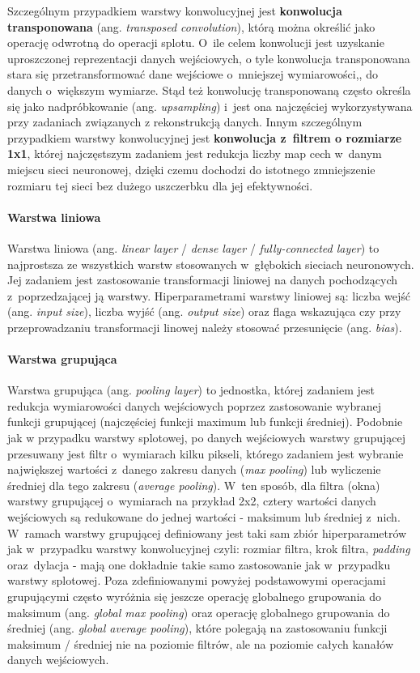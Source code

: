 Szczególnym przypadkiem warstwy konwolucyjnej jest \textbf{konwolucja transponowana} (ang. \emph{transposed convolution}), którą można określić jako operację odwrotną do operacji splotu. O~ile celem konwolucji jest uzyskanie uproszczonej reprezentacji danych wejściowych, o tyle konwolucja transponowana stara się przetransformować dane wejściowe o~mniejszej wymiarowości,, do danych o~większym wymiarze. Stąd też konwolucję transponowaną często określa się jako nadpróbkowanie (ang. \emph{upsampling}) i~jest ona najczęściej wykorzystywana przy zadaniach związanych z rekonstrukcją danych. Innym szczególnym przypadkiem warstwy konwolucyjnej jest \textbf{konwolucja z~filtrem o rozmiarze 1x1}, której najczęstszym zadaniem jest redukcja liczby map cech w~danym miejscu sieci neuronowej, dzięki czemu dochodzi do istotnego zmniejszenie rozmiaru tej sieci bez dużego uszczerbku dla jej efektywności. 

\paragraph*{Warstwa liniowa}

Warstwa liniowa (ang. \emph{linear layer} / \emph{dense layer} / \emph{fully-connected layer}) to najprostsza ze wszystkich warstw stosowanych w~głębokich sieciach neuronowych. Jej zadaniem jest zastosowanie transformacji liniowej na danych pochodzących z~poprzedzającej ją warstwy. Hiperparametrami warstwy liniowej są: liczba wejść (ang. \emph{input size}), liczba wyjść (ang. \emph{output size}) oraz flaga wskazująca czy przy przeprowadzaniu transformacji linowej należy stosować przesunięcie (ang. \emph{bias}).

\paragraph*{Warstwa grupująca}

Warstwa grupująca (ang. \emph{pooling layer}) to jednostka, której zadaniem jest redukcja wymiarowości danych wejściowych poprzez zastosowanie wybranej funkcji grupującej (najczęściej funkcji maximum lub funkcji średniej). Podobnie jak w przypadku warstwy splotowej, po danych wejściowych warstwy grupującej przesuwany jest filtr o~wymiarach kilku pikseli, którego zadaniem jest wybranie największej wartości z~danego zakresu danych (\emph{max pooling}) lub wyliczenie średniej dla tego zakresu (\emph{average pooling}). W~ten sposób, dla filtra (okna) warstwy grupującej o~wymiarach na przykład 2x2, cztery wartości danych wejściowych są redukowane do jednej wartości - maksimum lub średniej z~nich. W~ramach warstwy grupującej definiowany jest taki sam zbiór hiperparametrów jak w~przypadku warstwy konwolucyjnej czyli: rozmiar filtra, krok filtra, \emph{padding} oraz~dylacja - mają one dokładnie takie samo zastosowanie jak w~przypadku warstwy splotowej. Poza zdefiniowanymi powyżej podstawowymi operacjami grupującymi często wyróżnia się jeszcze operację globalnego grupowania do maksimum (ang. \emph{global max pooling}) oraz operację globalnego grupowania do średniej (ang. \emph{global average pooling}), które polegają na zastosowaniu funkcji maksimum / średniej nie na poziomie filtrów, ale na poziomie całych kanałów danych wejściowych. 

